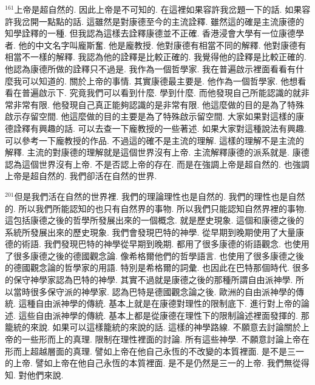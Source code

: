 \documentclass{book}
\begin{document}
$^{161}$上帝是超自然的.
因此上帝是不可知的.
在這裡如果容許我岔題一下的話.
如果容許我岔開一點點的話.
這雖然是對康德至今的主流詮釋.
雖然這的確是主流康德的知學詮釋的一種.
但我認為這樣去詮釋康德並不正確.
香港浸會大學有一位康德學者.
他的中文名字叫龐斯奮.
他是龐教授.
他對康德有相當不同的解釋.
他對康德有相當不一樣的解釋.
我認為他的詮釋是比較正確的.
我覺得他的詮釋是比較正確的.
他認為康德所做的詮釋只不過是.
我作為一個哲學家.
我在普遍啟示裡面看看有什麼我可以知道的.
關於上帝的事情.
其實康德最主要是.
他作為一個哲學家.
他想看看在普遍啟示下.
究竟我們可以看到什麼.
學到什麼.
而他發現自己所能認識的就非常非常有限.
他發現自己真正能夠認識的是非常有限.
他這麼做的目的是為了特殊啟示存留空間.
他這麼做的目的主要是為了特殊啟示留空間.
大家如果對這樣的康德詮釋有興趣的話.
可以去查一下龐教授的一些著述.
如果大家對這種說法有興趣.
可以參考一下龐教授的作品.
不過這的確不是主流的理解.
這樣的理解不是主流的解釋.
主流的對康德的理解就是這個世界沒有上帝.
主流解釋康德的派系就是.
康德認為這個世界沒有上帝.
不是否認上帝的存在.
而是在強調上帝是超自然的.
也強調上帝是超自然的.
我們卻活在自然的世界.

$^{201}$但是我們活在自然的世界裡.
我們的理論理性也是自然的.
我們的理性也是自然的.
所以我們所能認知的也只有自然界的事物.
所以我們只能認知自然界裡的事物.
這包括康德之後的哲學所發展出來的一個概念.
就是歷史現象.
這個和康德之後的系統所發展出來的歷史現象.
我們會發現巴特的神學.
從早期到晚期使用了大量康德的術語.
我們發現巴特的神學從早期到晚期.
都用了很多康德的術語觀念.
也使用了很多康德之後的德國觀念論.
像希格爾他們的哲學語言.
也使用了很多康德之後的德國觀念論的哲學家的用語.
特別是希格爾的詞彙.
也因此在巴特那個時代.
很多的保守神學家認為巴特的神學.
其實不過就是康德之後的那種所謂自由派神學.
所以當時很多保守派的神學家.
認為巴特是德國觀念論之後.
歐洲的自由派神學的傳統.
這種自由派神學的傳統.
基本上就是在康德對理性的限制底下.
進行對上帝的論述.
這些自由派神學的傳統.
基本上都是從康德在理性下的限制論述裡面發揮的.
那籠統的來說.
如果可以這樣籠統的來說的話.
這樣的神學路線.
不願意去討論關於上帝的一些形而上的真理.
限制在理性裡面的討論.
所有這些神學.
不願意討論上帝在形而上超越層面的真理.
譬如上帝在他自己永恆的不改變的本質裡面.
是不是三一的上帝.
譬如上帝在他自己永恆的本質裡面.
是不是仍然是三一的上帝.
我們無從得知.
對他們來說.
\end{document}
